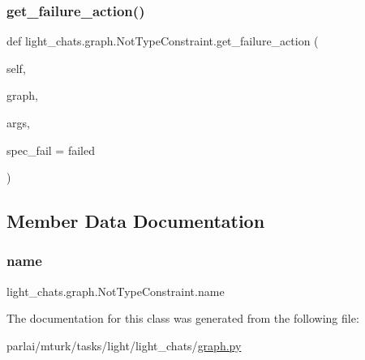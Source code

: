 \subsubsection{\texorpdfstring{get\+\_\+failure\+\_\+action()}{get\_failure\_action()}}
{\footnotesize\ttfamily def light\+\_\+chats.\+graph.\+Not\+Type\+Constraint.\+get\+\_\+failure\+\_\+action (\begin{DoxyParamCaption}\item[{}]{self,  }\item[{}]{graph,  }\item[{}]{args,  }\item[{}]{spec\+\_\+fail = {\ttfamily \textquotesingle{}failed\textquotesingle{}} }\end{DoxyParamCaption})}



\subsection{Member Data Documentation}
\mbox{\label{classlight__chats_1_1graph_1_1NotTypeConstraint_ad6119b9dbdfc0d1049e91e3f46832601}} 
\subsubsection{\texorpdfstring{name}{name}}
{\footnotesize\ttfamily light\+\_\+chats.\+graph.\+Not\+Type\+Constraint.\+name\hspace{0.3cm}{\ttfamily [static]}}



The documentation for this class was generated from the following file\+:\begin{DoxyCompactItemize}
\item 
parlai/mturk/tasks/light/light\+\_\+chats/\hyperlink{parlai_2mturk_2tasks_2light_2light__chats_2graph_8py}{graph.\+py}\end{DoxyCompactItemize}
